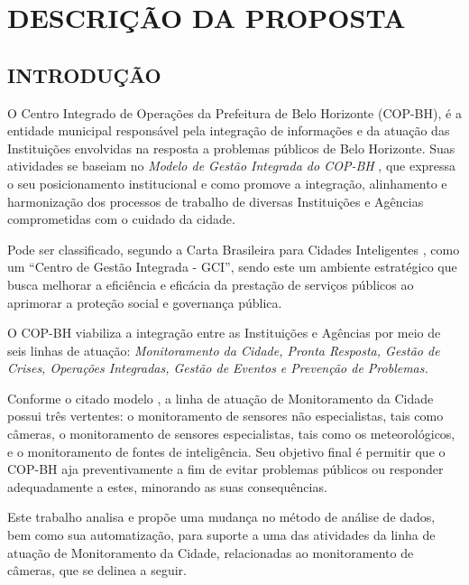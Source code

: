 
\chapter{DESCRIÇÃO DA PROPOSTA}
\label{chap:descricao}

\section{INTRODUÇÃO}
\label{sec:introducao}
O Centro Integrado de Operações da Prefeitura de Belo Horizonte (COP-BH), é a entidade municipal responsável pela integração de informações e da atuação das Instituições envolvidas na resposta a problemas públicos de Belo Horizonte. Suas atividades se baseiam no \textit{Modelo de Gestão Integrada do COP-BH} \cite{ModeloGestaoCOP}, que expressa o seu posicionamento institucional e como promove a integração, alinhamento e harmonização dos processos de trabalho de diversas Instituições e Agências comprometidas com o cuidado da cidade.

Pode ser classificado, segundo a Carta Brasileira para Cidades Inteligentes \cite{CartaCidades}, como um ``Centro de Gestão Integrada - GCI'', sendo este um ambiente estratégico que busca melhorar a eficiência e eficácia da prestação de serviços públicos ao aprimorar a proteção social e governança pública.

O COP-BH viabiliza a integração entre as Instituições e Agências por meio de seis linhas de atuação: \textit{Monitoramento da Cidade, Pronta Resposta, Gestão de Crises, Operações Integradas, Gestão de Eventos e Prevenção de Problemas.}

Conforme o citado modelo \cite{ModeloGestaoCOP}, a linha de atuação de Monitoramento da Cidade possui três vertentes: o monitoramento de sensores não especialistas, tais como câmeras, o monitoramento de sensores especialistas, tais como os meteorológicos, e o monitoramento de fontes de inteligência. Seu objetivo final é permitir que o COP-BH aja preventivamente a fim de evitar problemas públicos ou responder adequadamente a estes, minorando as suas consequências.

Este trabalho analisa e propõe uma mudança no método de análise de dados, bem como sua automatização, para suporte a uma das atividades da linha de atuação de Monitoramento da Cidade, relacionadas ao monitoramento de câmeras, que se delinea a seguir.

